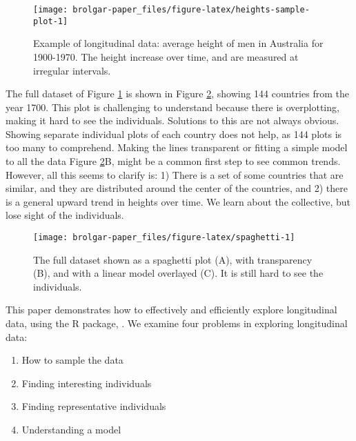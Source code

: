 \begin{figure}

{\centering \texttt{[image: brolgar-paper\_files/figure-latex/heights-sample-plot-1]} 

}

\caption{Example of longitudinal data: average height of men in Australia for 1900-1970. The height increase over time, and are measured at irregular intervals.}\label{fig:heights-sample-plot}
\end{figure}

The full dataset of Figure \ref{fig:heights-sample-plot} is shown in Figure \ref{fig:spaghetti}, showing 144 countries from the year 1700. This plot is challenging to understand because there is overplotting, making it hard to see the individuals. Solutions to this are not always obvious. Showing separate individual plots of each country does not help, as 144 plots is too many to comprehend. Making the lines transparent or fitting a simple model to all the data Figure \ref{fig:spaghetti}B, might be a common first step to see common trends. However, all this seems to clarify is: 1) There is a set of some countries that are similar, and they are distributed around the center of the countries, and 2) there is a general upward trend in heights over time. We learn about the collective, but lose sight of the individuals.

\begin{figure}

{\centering \texttt{[image: brolgar-paper\_files/figure-latex/spaghetti-1]} 

}

\caption{The full dataset shown as a spaghetti plot (A), with transparency (B), and with a linear model overlayed (C). It is still hard to see the individuals.}\label{fig:spaghetti}
\end{figure}

This paper demonstrates how to effectively and efficiently explore longitudinal data, using the R package, . We examine four problems in exploring longitudinal data:

\begin{enumerate}
\def\labelenumi{\arabic{enumi}.}
\tightlist
\item
  How to sample the data
\item
  Finding interesting individuals
\item
  Finding representative individuals
\item
  Understanding a model
\end{enumerate}

